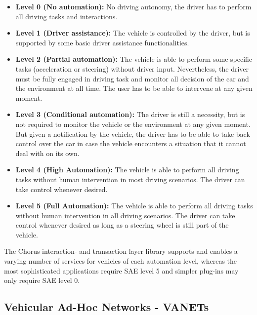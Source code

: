 \documentclass{llncs}
\begin{document}
{			\begin{itemize}
				\item \textbf{Level 0 (No automation): }No driving autonomy, the driver has to perform all driving tasks and interactions.
				\item \textbf{Level 1 (Driver assistance): }The vehicle is controlled by the driver, but is supported by some basic driver assistance functionalities.
				\item \textbf{Level 2 (Partial automation): }The vehicle is able to perform some specific tasks (acceleration or steering) without driver input. Nevertheless, the driver must be fully engaged in driving task and monitor all decision of the car and the environment at all time. The user has to be able to intervene at any given moment. 
				\item \textbf{Level 3 (Conditional automation): }The driver is still a necessity, but is not required to monitor the vehicle or the environment at any given moment. But given a notification by the vehicle, the driver has to be able to take back control over the car in case the vehicle encounters a situation that it cannot deal with on its own.
				\item \textbf{Level 4 (High Automation): }The vehicle is able to perform all driving tasks without human intervention in most driving scenarios. The driver can take control whenever desired.
				\item \textbf{Level 5 (Full Automation): }The vehicle is able to perform all driving tasks without human intervention in all driving scenarios. The driver can take control whenever desired as long as a steering wheel is still part of the vehicle.
			\end{itemize}
			
			The Chorus interaction- and transaction layer library supports and enables a varying number of services for vehicles of each automation level, whereas the most sophisticated applications require SAE level 5 and simpler plug-ins may only require SAE level 0.

		
		\subsection{Vehicular Ad-Hoc Networks - VANETs}
			\label{ss:vanets}

}
\end{document}
